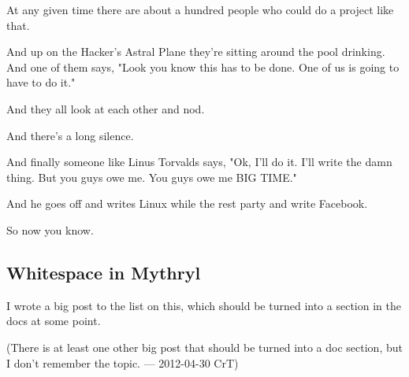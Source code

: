 At any given time there are about a hundred people 
who could do a project like that. 

And up on the Hacker's Astral Plane they're sitting 
around the pool drinking.  And one of them says, 
"Look you know this has to be done.  One of us is 
going to have to do it." 

And they all look at each other and nod. 

And there's a long silence. 

And finally someone like Linus Torvalds says, 
"Ok, I'll do it.  I'll write the damn thing. 
But you guys owe me.  You guys owe me BIG TIME." 

And he goes off and writes Linux while the rest 
party and write Facebook. 

So now you know. 



\subsection{Whitespace in Mythryl}

I wrote a big post to the list on this, which should be turned 
into a section in the docs at some point. 

(There is at least one other big post that should be turned into 
a doc section, but I don't remember the topic. --- 2012-04-30 CrT) 

